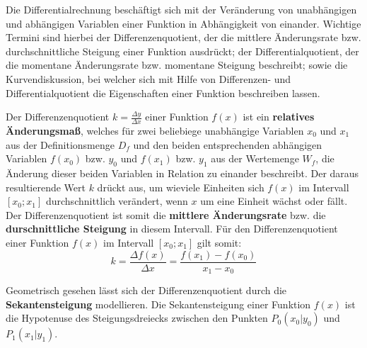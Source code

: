 



\thispagestyle{plain}


Die Differentialrechnung besch\"{a}ftigt sich mit der Ver\"{a}nderung von unabh\"{a}ngigen und abh\"{a}ngigen Variablen einer Funktion in Abh\"{a}ngigkeit von einander. Wichtige Termini sind hierbei der Differenzenquotient, der die mittlere \"{A}nderungsrate bzw. durchschnittliche Steigung einer Funktion ausdr\"{u}ckt; der Differentialquotient, der die momentane \"{A}nderungsrate bzw. momentane Steigung beschreibt; sowie die Kurvendiskussion, bei welcher sich mit Hilfe von Differenzen- und Differentialquotient die Eigenschaften einer Funktion beschreiben lassen.


Der Differenzenquotient $k = \frac{\Delta y}{\Delta x}$ einer Funktion $f(x)$ ist ein \textbf{relatives \"{A}nderungsma\ss{}}, welches f\"{u}r zwei beliebiege unabh\"{a}ngige Variablen $x_{0}$ und $x_{1}$ aus der Definitionsmenge $D_{f}$ und den beiden entsprechenden abh\"{a}ngigen Variablen $f(x_{0})$ bzw. $y_{0}$ und $f(x_{1})$ bzw. $y_{1}$ aus der Wertemenge $W_{f}$, die \"{A}nderung dieser beiden Variablen in Relation zu einander beschreibt. Der daraus resultierende Wert $k$ dr\"{u}ckt aus, um wieviele Einheiten sich $f(x)$ im Intervall $[x_{0} ; x_{1}]$ durchschnittlich ver\"{a}ndert, wenn $x$ um eine Einheit w\"{a}chst oder f\"{a}llt. Der Differenzenquotient ist somit die \textbf{mittlere \"{A}nderungsrate} bzw. die \textbf{durschnittliche Steigung} in diesem Intervall. F\"{u}r den Differenzenquotient einer Funktion $f(x)$ im Intervall $[x_{0} ; x_{1}]$ gilt somit: $$k = \frac{\Delta f(x)}{\Delta x} = \frac{f(x_{1}) - f(x_{0})}{x_{1} - x_{0}}$$

Geometrisch gesehen l\"{a}sst sich der Differenzenquotient durch die \textbf{Sekantensteigung} modellieren. Die Sekantensteigung einer Funktion $f(x)$ ist die Hypotenuse des Steigungsdreiecks zwischen den Punkten $P_{0}(x_{0}|y_{0})$ und $P_{1}(x_{1}|y_{1})$.

